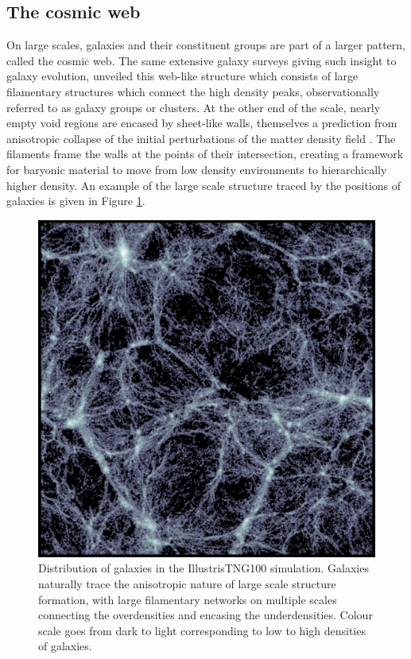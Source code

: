 \subsection{The cosmic web} \label{sec:cosmic_web_intro}
On large scales, galaxies and their constituent groups are part of a larger pattern, called the cosmic web. The same extensive galaxy surveys giving such insight to galaxy evolution, unveiled this web-like structure \citep[e.g.][]{delapparent1986, colless2001, tegmark2004} which consists of large filamentary structures which connect the high density peaks, observationally referred to as galaxy groups or clusters. At the other end of the scale, nearly empty void regions are encased by sheet-like walls, themselves a prediction from anisotropic collapse of the initial perturbations of the matter density field \citep{zeldovich1970, shandarin1989}. The filaments frame the walls at the points of their intersection, creating a framework for baryonic material to move from low density environments to hierarchically higher density. An example of the large scale structure traced by the positions of galaxies is given in Figure \ref{fig:cosmo_web_tng}.

\begin{figure}
	\includegraphics[width=\linewidth]{thesis/latex/introduction/slice_image_bone.pdf}
    \caption{Distribution of galaxies in the IllustrisTNG100 simulation. Galaxies naturally trace the anisotropic nature of large scale structure formation, with large filamentary networks on multiple scales connecting the overdensities and encasing the underdensities. Colour scale goes from dark to light corresponding to low to high densities of galaxies.}
    \label{fig:cosmo_web_tng}
\end{figure}

